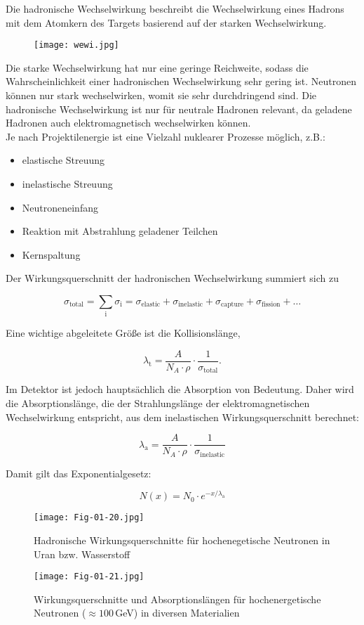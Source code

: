 Die hadronische Wechselwirkung beschreibt die Wechselwirkung eines Hadrons mit dem Atomkern des
Targets basierend auf der starken Wechselwirkung. 

\begin{figure}[H]
	\centering
	\texttt{[image: wewi.jpg]}
\end{figure}

Die starke Wechselwirkung hat nur eine geringe Reichweite, sodass die Wahrscheinlichkeit einer
hadronischen Wechselwirkung sehr gering ist. Neutronen können nur stark wechselwirken, womit sie
sehr durchdringend sind. Die hadronische Wechselwirkung ist nur für neutrale Hadronen relevant, da
geladene Hadronen auch elektromagnetisch wechselwirken können. 
\\
Je nach Projektilenergie ist eine Vielzahl nuklearer Prozesse möglich, z.B.:

\begin{itemize}
  \item elastische Streuung
  \item inelastische Streuung
  \item Neutroneneinfang
  \item Reaktion mit Abstrahlung geladener Teilchen
  \item Kernspaltung
\end{itemize}

Der Wirkungsquerschnitt der hadronischen Wechselwirkung summiert sich zu

\[\sigma_\text{total} = \sum_\text{i} \sigma_\text{i} = \sigma_\text{elastic}+
\sigma_\text{inelastic}+ \sigma_\text{capture}+ \sigma_\text{fission} +\ldots\]

Eine wichtige abgeleitete Größe ist die Kollisionslänge,

\[ \lambda_\text{t} = \frac{A}{N_A\cdot\rho}\cdot \frac{1}{\sigma_\text{total}}. \]

Im Detektor ist jedoch hauptsächlich die Absorption von Bedeutung. Daher wird die Absorptionslänge,
die der Strahlungslänge der elektromagnetischen Wechselwirkung entspricht, aus dem inelastischen
Wirkungsquerschnitt berechnet:

\[ \lambda_\text{a} =  \frac{A}{N_A\cdot\rho}\cdot \frac{1}{\sigma_\text{inelastic}}\]

Damit gilt das Exponentialgesetz:

\[N(x) = N_0\cdot e^{-x/\lambda_\text{a}} \]

 
\begin{figure}[H]
	\centering
	\texttt{[image: Fig-01-20.jpg]}
	\caption{Hadronische Wirkungsquerschnitte für hochenegetische Neutronen in Uran bzw. Wasserstoff}
	\label{hadrwewi2}
\end{figure}

\begin{figure}[H]
	\centering
	\texttt{[image: Fig-01-21.jpg]}
	\caption{Wirkungsquerschnitte und Absorptionslängen für hochenergetische Neutronen ($\approx
	100\,$GeV) in diversen Materialien}
	\label{hadrwewitab}
\end{figure}